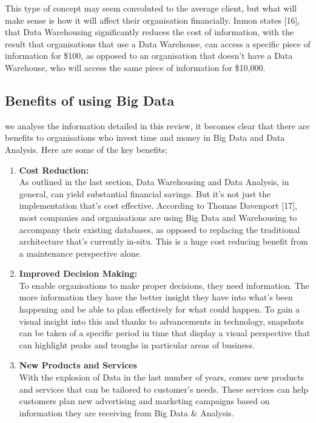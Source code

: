 \documentclass[10pt,journal,compsoc]{IEEEtran}
\begin{document}
This type of concept may seem convoluted to the average client, but what will make sense is how it will affect their organisation financially. Inmon states [16], that Data Warehousing significantly reduces the cost of information, with the result that organisations that use a Data Warehouse, can access a specific piece of information for \$100, as opposed to an organisation that doesn't have a Data Warehouse, who will access the same piece of information for \$10,000.

\subsection{Benefits of using Big Data}
 we analyse the information detailed in this review, it becomes clear that there are benefits to organisations who invest time and money in Big Data and Data Analysis. Here are some of the key benefits;

\begin{enumerate}
	\item \textbf{Cost Reduction:}\\ As outlined in the last section, Data Warehousing and Data Analysis, in general, can yield substantial financial savings. But it's not just the implementation that's cost effective. According to Thomas Davenport [17], most companies and organisations are using Big Data and Warehousing to accompany their existing databases, as opposed to replacing the traditional architecture that's currently in-situ. This is a huge cost reducing benefit from a maintenance perspective alone. \\
	
	\item \textbf{Improved Decision Making:}\\ To enable organisations to make proper decisions, they need information. The more information they have the better insight they have into what's been happening and be able to plan effectively for what could happen. To gain a visual insight into this and thanks to advancements in technology, snapshots can be taken of a specific period in time that display a visual perspective that can highlight peaks and troughs in particular areas of business. \\
	
	\item \textbf{New Products and Services}\\With the explosion of Data in the last number of years, comes new products and services that can be tailored to customer’s needs. These services can help customers plan new advertising and marketing campaigns based on information they are receiving from Big Data \& Analysis. 
	 
\end{enumerate}
\end{document}
